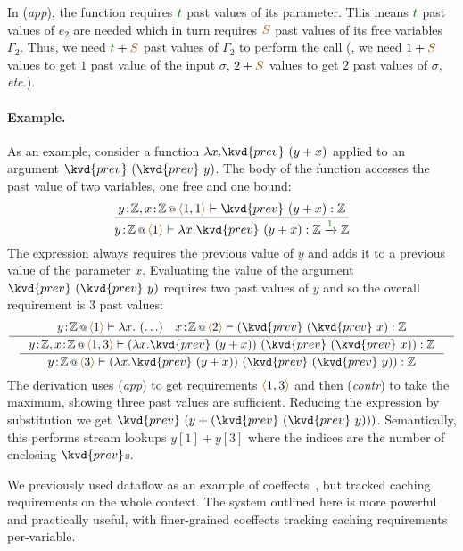 In (\emph{app}), the function requires $\cclrd{t}$ past values of
its parameter.  This means $\cclrd{t}$ past values of
$e_2$ are needed which in turn requires $\aclrd{S}$ past values of its free
variables $\Gamma_2$. Thus, we need $\cclrd{t}+\aclrd{S}$ past values of $\Gamma_2$ to perform the
call (\eg{}, we need $1+\aclrd{S}$ values to
get $1$ past value of the input $\sigma$, $2+\aclrd{S}$
values to get $2$ past values of $\sigma$, \emph{etc.}).


\paragraph{Example.} As an example, consider a function $\lambda x.\kvd{prev}~(y+x)$ applied to an argument
$\kvd{prev}~(\kvd{prev}~y)$. The body of the function accesses the past value of two variables, one free
and one bound:
\[
\dfrac
  {\coctx{y\!:\!\mathbb{Z}, x\!:\!\mathbb{Z}}{\alift{1, 1}} \vdash \kvd{prev}~(y+x) : \mathbb{Z} }
  {\coctx{y\!:\!\mathbb{Z}}{\alift{1}} \vdash \lambda x . \kvd{prev}~(y+x) : \mathbb{Z} \xrightarrow{\cclrd{1}} \mathbb{Z} }
\]
The expression always requires the previous value of $y$ and adds it to
a previous value of the parameter $x$. Evaluating the value of the
argument $\kvd{prev}~(\kvd{prev}~y)$ requires two past values of $y$
and so the overall requirement is $3$ past values:
\[
\inference
  { \coctx{y\!:\!\mathbb{Z}}{\alift{1} } \vdash \lambda x.~(\ldots) \quad  \coctx{x\!:\!\mathbb{Z}}{\alift{2}} \vdash (\kvd{prev}~(\kvd{prev}~x) : \mathbb{Z} }
{\inference
  { \coctx{y\!:\!\mathbb{Z}, x\!:\!\mathbb{Z}}{\alift{1,3}} \vdash (\lambda x.\kvd{prev}~(y+x))~(\kvd{prev}~(\kvd{prev}~x)) : \mathbb{Z} }
  { \coctx{y\!:\!\mathbb{Z}}{\alift{3}} \vdash (\lambda x.\kvd{prev}~(y+x))~(\kvd{prev}~(\kvd{prev}~y)) : \mathbb{Z} } }
\]
The derivation uses (\emph{app}) to get requirements $\alift{1,3}$ and then 
(\emph{contr}) to take the maximum, showing three past values are sufficient. Reducing 
the expression by substitution we get $\kvd{prev}~(y+(\kvd{prev}~(\kvd{prev}~y)))$. 
Semantically, this performs stream lookups $y[1] + y[3]$ where the indices are the 
number of enclosing $\kvd{prev}$s.%

We previously used dataflow as an example of
coeffects~\cite{petricek2013coeffects}, but tracked caching
requirements on the whole context. The system outlined here is more
powerful and practically useful, with finer-grained coeffects tracking
caching requirements per-variable.


